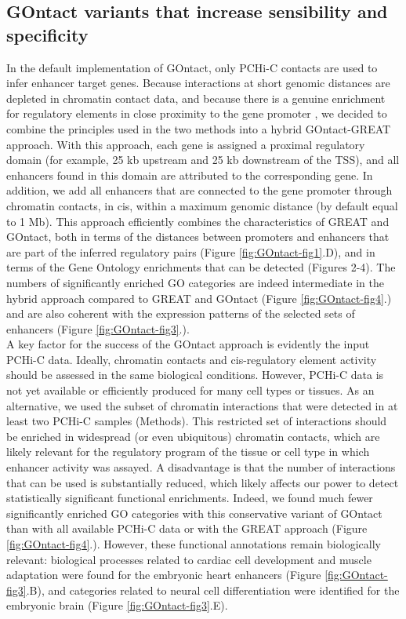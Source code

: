 \subsection{GOntact variants that increase sensibility and specificity}
In the default implementation of GOntact, only PCHi-C contacts are used to infer enhancer target genes. Because interactions at short genomic distances are depleted in chromatin contact data, and because there is a genuine enrichment for regulatory elements in close proximity to the gene promoter \citep{gasperini_genome-wide_2019}, we decided to combine the principles used in the two methods into a hybrid GOntact-GREAT approach. With this approach, each gene is assigned a proximal regulatory domain (for example, 25 kb upstream and 25 kb downstream of the TSS), and all enhancers found in this domain are attributed to the corresponding gene. In addition, we add all enhancers that are connected to the gene promoter through chromatin contacts, in cis, within a maximum genomic distance (by default equal to 1 Mb). This approach efficiently combines the characteristics of GREAT and GOntact, both in terms of the distances between promoters and enhancers that are part of the inferred regulatory pairs (Figure \ref{fig:GOntact-fig1}.D), and in terms of the Gene Ontology enrichments that can be detected (Figures 2-4). The numbers of significantly enriched GO categories are indeed intermediate in the hybrid approach compared to GREAT and GOntact (Figure \ref{fig:GOntact-fig4}.) and are also coherent with the expression patterns of the selected sets of enhancers (Figure \ref{fig:GOntact-fig3}.).\\

A key factor for the success of the GOntact approach is evidently the input PCHi-C data. Ideally, chromatin contacts and \gls{cis}-regulatory element activity should be assessed in the same biological conditions. However, PCHi-C data is not yet available or efficiently produced for many cell types or tissues. As an alternative, we used the subset of chromatin interactions that were detected in at least two PCHi-C samples (Methods). This restricted set of interactions should be enriched in widespread (or even ubiquitous) chromatin contacts, which are likely relevant for the regulatory program of the tissue or cell type in which enhancer activity was assayed. A disadvantage is that the number of interactions that can be used is substantially reduced, which likely affects our power to detect statistically significant functional enrichments. Indeed, we found much fewer significantly enriched GO categories with this conservative variant of GOntact than with all available PCHi-C data or with the GREAT approach (Figure \ref{fig:GOntact-fig4}.). However, these functional annotations remain biologically relevant: biological processes related to cardiac cell development and muscle adaptation were found for the embryonic heart enhancers (Figure \ref{fig:GOntact-fig3}.B), and categories related to neural cell differentiation were identified for the embryonic brain (Figure \ref{fig:GOntact-fig3}.E). 

